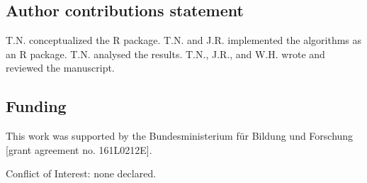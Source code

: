\documentclass{bioinfo}
\begin{document}
\subsection{Author contributions statement}

T.N. conceptualized the R package. T.N. and J.R. implemented the algorithms as 
an R package. T.N. analysed the results. T.N., J.R., and W.H. wrote and 
reviewed the manuscript.

\subsection{Funding}

This work was supported by the Bundesministerium für Bildung und Forschung 
[grant agreement no. 161L0212E].

Conflict of Interest: none declared.
\end{document}
